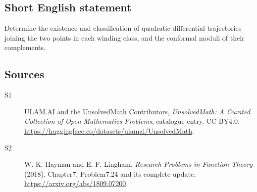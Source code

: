 \documentclass[11pt]{article}
\begin{document}
\subsection{Short English statement}
Determine the existence and classification of quadratic-differential trajectories joining the two points in each winding class, and the conformal moduli of their complements.
\subsection{Sources}
\begin{description}
\item[\hypertarget{source:statement:1}{S1}] ULAM.AI and the UnsolvedMath Contributors, \emph{UnsolvedMath: A Curated Collection of Open Mathematics Problems}, catalogue entry. CC BY4.0. \url{https://huggingface.co/datasets/ulamai/UnsolvedMath}.
\item[\hypertarget{source:statement:2}{S2}] W. K. Hayman and E. F. Lingham, \emph{Research Problems in Function Theory} (2018), Chapter7, Problem7.24 and its complete update. \url{https://arxiv.org/abs/1809.07200}.
\end{description}
\label{end:statement}
\end{document}
